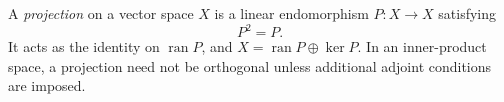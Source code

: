 
A \emph{projection} on a vector space $X$ is a linear endomorphism $P:X\to X$ satisfying
\[
P^2=P.
\]
It acts as the identity on $\operatorname{ran}P$, and $X=\operatorname{ran}P\oplus\ker P$. In an inner-product space, a projection need not be orthogonal unless additional adjoint conditions are imposed.
